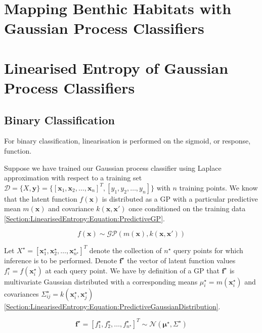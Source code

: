 \documentclass{article}
\renewcommand{\vec}[1]{\boldsymbol{#1}}
\begin{document}
\section{Mapping Benthic Habitats with Gaussian Process Classifiers}
\label{Section:BenthicMapping}

	
	
\section{Linearised Entropy of Gaussian Process Classifiers}
\label{Section:LinearisedEntropy}

	\subsection{Binary Classification}
	
		For binary classification, linearisation is performed on the sigmoid, or response, function.
	
		Suppose we have trained our Gaussian process classifier using Laplace approximation with respect to a training set $\mathcal{D} = \{X, \vec{y}\} = \{[ \vec{x}_{1}, \vec{x}_{2}, \dots, \vec{x}_{n}]^{T}, [y_{1}, y_{2}, \dots, y_{n}]\}$ with $n$ training points. We know that the latent function $f(\vec{x})$ is distributed as a GP with a particular predictive mean $m(\vec{x})$ and covariance $k(\vec{x}, \vec{x}')$ once conditioned on the training data \eqref{Section:LinearisedEntropy:Equation:PredictiveGP}.
		
		\begin{equation}
			f(\vec{x}) \sim \mathcal{GP}(m(\vec{x}), k(\vec{x}, \vec{x}'))
		\label{Section:LinearisedEntropy:Equation:PredictiveGP}
		\end{equation}
		
		Let $X^{\star} = [ \vec{x}^{\star}_{1}, \vec{x}^{\star}_{2}, \dots, \vec{x}^{\star}_{n^{\star}}]^{T}$ denote the collection of $n^{\star}$ query points for which inference is to be performed. Denote $\vec{f}^{\star}$ the vector of latent function values $f^{\star}_{i} = f(\vec{x}^{\star}_{i})$ at each query point. We have by definition of a GP that $\vec{f}^{\star}$ is multivariate Gaussian distributed with a corresponding means $\mu^{\star}_{i} = m(\vec{x}^{\star}_{i})$ and covariances $\Sigma^{\star}_{ij} = k(\vec{x}^{\star}_{i}, \vec{x}^{\star}_{j})$ \eqref{Section:LinearisedEntropy:Equation:PredictiveGaussianDistribution}.
		
		\begin{equation}
			\vec{f}^{\star} = [f^{\star}_{1}, f^{\star}_{2}, \dots, f^{\star}_{n^{\star}}]^{T} \sim \mathcal{N}(\vec{\mu}^{\star}, \Sigma^{\star})
		\label{Section:LinearisedEntropy:Equation:PredictiveGaussianDistribution}
		\end{equation}
			
\end{document}
